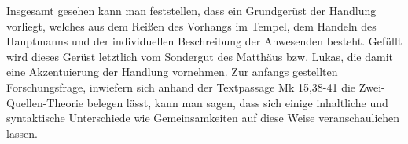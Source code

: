 Insgesamt gesehen kann man feststellen, dass ein Grundgerüst der Handlung vorliegt, welches aus dem Reißen des Vorhangs im Tempel, dem Handeln des Hauptmanns und der individuellen Beschreibung der Anwesenden besteht. Gefüllt wird dieses Gerüst letztlich vom Sondergut des Matthäus bzw. Lukas, die damit eine Akzentuierung der Handlung vornehmen. Zur anfangs gestellten Forschungsfrage, inwiefern sich anhand der Textpassage Mk 15,38-41 die Zwei-Quellen-Theorie belegen lässt, kann man sagen, dass sich einige inhaltliche und syntaktische Unterschiede wie Gemeinsamkeiten auf diese Weise veranschaulichen lassen.


